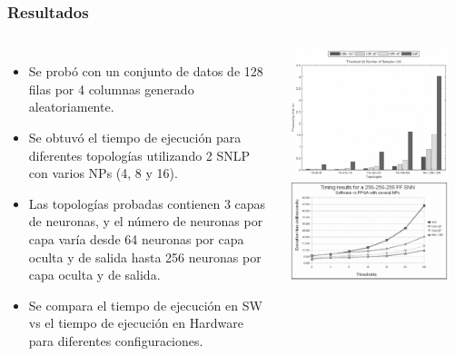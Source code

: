 \frame
{
\frametitle{Resultados}
\begin{columns}

\begin{itemize}
\item Se probó con un conjunto de datos de 128 filas por 4 columnas generado aleatoriamente. 
\item Se obtuvó el tiempo de ejecución para diferentes topologías utilizando 2 SNLP con varios NPs (4, 8 y 16). 
\item Las topologías probadas contienen 3 capas de neuronas, y el número de neuronas por capa varía desde 64 neuronas por capa oculta y de salida hasta 256 neuronas por capa oculta y de salida.
\item Se compara el tiempo de ejecución en SW vs el tiempo de ejecución en Hardware para diferentes configuraciones. 
\end{itemize} 

        \includegraphics[width=0.9\textwidth]{Figs/2009_BackPropagationFF03}\\
        \includegraphics[width=0.9\textwidth]{Figs/2009_BackPropagationFF04}
\end{columns}
}

